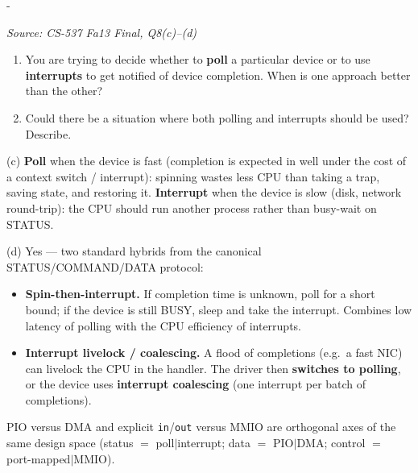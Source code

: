 \documentclass[11pt,a4paper]{article}
\makeatletter
\newcommand{\keepspace}[1]{\par\penalty-100\begingroup
  \setlength{\dimen@}{#1}\dimen@ii\pagegoal\advance\dimen@ii-\pagetotal
  \ifdim\dimen@>\dimen@ii\ifdim\dimen@ii>\z@\vfil\fi\break\fi\endgroup}
\newcounter{qn}[section]
\newenvironment{Qn}[4]{%
  \refstepcounter{qn}\keepspace{7\baselineskip}%
  \begin{tcolorbox}[qboxstyle, title={Q\thesection.\theqn\ \ [#1 \textbar\ #2]\ \ #4}]%
  {\footnotesize\color{g3}\textit{Source: #3}}\par\smallskip%
}{%
  \end{tcolorbox}%
}
\newenvironment{Sol}{%
  \begin{tcolorbox}[sboxstyle, title={Solution}]%
}{%
  \end{tcolorbox}\vspace{0.35em}%
}
\makeatother
\begin{document}
\begin{Qn}{Medium-Hard}{Lect 21}{CS-537 Fa13 Final, Q8(c)--(d)}{Polling versus interrupts, and the hybrid}
\begin{enumerate}[label=(\alph*), start=3]
\item You are trying to decide whether to \textbf{poll} a particular
      device or to use \textbf{interrupts} to get notified of device
      completion. When is one approach better than the other?
\item Could there be a situation where both polling and interrupts
      should be used? Describe.
\end{enumerate}
\end{Qn}
\begin{Sol}
(c) \textbf{Poll} when the device is fast (completion is expected in
well under the cost of a context switch / interrupt): spinning wastes
less CPU than taking a trap, saving state, and restoring it.
\textbf{Interrupt} when the device is slow (disk, network round-trip):
the CPU should run another process rather than busy-wait on STATUS.

(d) Yes --- two standard hybrids from the canonical
STATUS/COMMAND/DATA protocol:
\begin{itemize}
\item \textbf{Spin-then-interrupt.} If completion time is unknown, poll
      for a short bound; if the device is still BUSY, sleep and take the
      interrupt. Combines low latency of polling with the CPU efficiency
      of interrupts.
\item \textbf{Interrupt livelock / coalescing.} A flood of completions
      (e.g.\ a fast NIC) can livelock the CPU in the handler. The driver
      then \textbf{switches to polling}, or the device uses
      \textbf{interrupt coalescing} (one interrupt per batch of
      completions).
\end{itemize}
PIO versus DMA and explicit \texttt{in}/\texttt{out} versus MMIO are
orthogonal axes of the same design space (status $=$ poll$|$interrupt;
data $=$ PIO$|$DMA; control $=$ port-mapped$|$MMIO).
\end{Sol}
\end{document}
